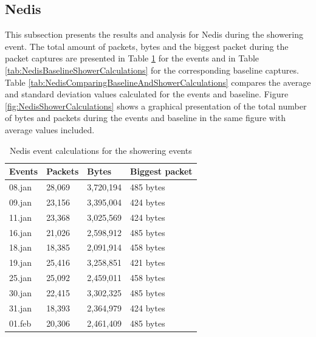 \newpage
\subsection{Nedis}
This subsection presents the results and analysis for Nedis during the showering event. The total amount of packets, bytes and the biggest packet during the packet captures are presented in Table \ref{tab:NedisShoweringCalculations} for the events and in Table \ref{tab:NedisBaselineShowerCalculations} for the corresponding baseline captures. Table \ref{tab:NedisComparingBaselineAndShowerCalculations} compares the average and standard deviation values calculated for the events and baseline. Figure \ref{fig:NedisShowerCalculations} shows a graphical presentation of the total number of bytes and packets during the events and baseline in the same figure with average values included.

\begin{table}[H]
\centering
    \caption{Nedis event calculations for the showering events}
\label{tab:NedisShoweringCalculations}
    \begin{tabular}{|l|l|l|l|}
        \hline
        \textbf{Events} & \textbf{Packets} & \textbf{Bytes} & \textbf{Biggest packet} \\ \hline
        08.jan          & 28,069           & 3,720,194      & 485 bytes               \\ \hline
        09.jan          & 23,156           & 3,395,004      & 424 bytes               \\ \hline
        11.jan          & 23,368           & 3,025,569      & 424 bytes               \\ \hline
        16.jan          & 21,026           & 2,598,912      & 485 bytes               \\ \hline
        18.jan          & 18,385           & 2,091,914      & 458 bytes               \\ \hline
        19.jan          & 25,416           & 3,258,851      & 421 bytes               \\ \hline
        25.jan          & 25,092           & 2,459,011      & 458 bytes               \\ \hline
        30.jan          & 22,415           & 3,302,325      & 485 bytes               \\ \hline
        31.jan          & 18,393           & 2,364,979      & 424 bytes               \\ \hline
        01.feb          & 20,306           & 2,461,409      & 485 bytes               \\ \hline
    \end{tabular}
\end{table}

